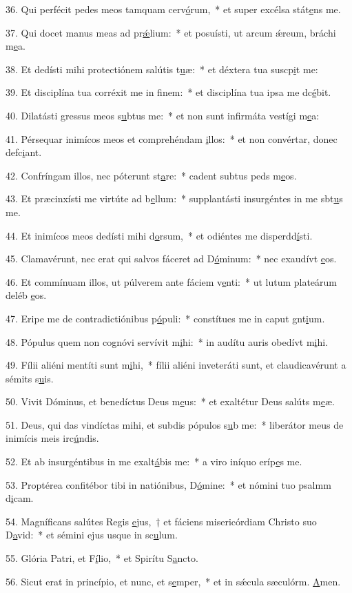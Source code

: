 36. Qui perfécit pedes meos tamquam cerv\uline{ó}rum,~* et super excélsa stát\uline{e}ns me.\par 
37. Qui docet manus meas ad pr\uline{ǽ}lium:~* et posuísti, ut arcum ǽreum, bráchi m\uline{e}a.\par 
38. Et dedísti mihi protectiónem salútis t\uline{u}æ:~* et déxtera tua suscp\uline{i}t me:\par 
39. Et disciplína tua corréxit me in f\uline{i}nem:~* et disciplína tua ipsa me dc\uline{é}bit.\par 
40. Dilatásti gressus meos s\uline{u}btus me:~* et non sunt infirmáta vestígi m\uline{e}a:\par 
41. Pérsequar inimícos meos et comprehéndam \uline{i}llos:~* et non convértar, donec defc\uline{i}ant.\par 
42. Confríngam illos, nec póterunt st\uline{a}re:~* cadent subtus peds m\uline{e}os.\par 
43. Et præcinxísti me virtúte ad b\uline{e}llum:~* supplantásti insurgéntes in me sbt\uline{u}s me.\par 
44. Et inimícos meos dedísti mihi d\uline{o}rsum,~* et odiéntes me disperdd\uline{í}sti.\par 
45. Clamavérunt, nec erat qui salvos fáceret ad D\uline{ó}minum:~* nec exaudívt \uline{e}os.\par 
46. Et commínuam illos, ut púlverem ante fáciem v\uline{e}nti:~* ut lutum plateárum deléb \uline{e}os.\par 
47. Eripe me de contradictiónibus p\uline{ó}puli:~* constítues me in caput gnt\uline{i}um.\par 
48. Pópulus quem non cognóvi servívit m\uline{i}hi:~* in audítu auris obedívt m\uline{i}hi.\par 
49. Fílii aliéni mentíti sunt m\uline{i}hi,~* fílii aliéni inveteráti sunt, et claudicavérunt a sémits s\uline{u}is.\par 
50. Vivit Dóminus, et benedíctus Deus m\uline{e}us:~* et exaltétur Deus salúts m\uline{e}æ.\par 
51. Deus, qui das vindíctas mihi, et subdis pópulos s\uline{u}b me:~* liberátor meus de inimícis meis irc\uline{ú}ndis.\par 
52. Et ab insurgéntibus in me exalt\uline{á}bis me:~* a viro iníquo eríp\uline{e}s me.\par 
53. Proptérea confitébor tibi in natiónibus, D\uline{ó}mine:~* et nómini tuo psalmm d\uline{i}cam.\par 
54. Magníficans salútes Regis \uline{e}jus,~† et fáciens misericórdiam Christo suo D\uline{a}vid:~* et sémini ejus usque in sc\uline{u}lum.\par 
55. Glória Patri, et F\uline{í}lio,~* et Spirítu S\uline{a}ncto.\par 
56. Sicut erat in princípio, et nunc, et s\uline{e}mper,~* et in sǽcula sæculórm. \uline{A}men.\par 
